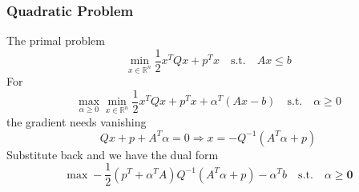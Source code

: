 \documentclass[../main.tex]{subfiles}
\begin{document}
            \subsubsection{Quadratic Problem}
                The primal problem
                \[
                    \min_{x\in\mathbb{R}^n} \frac{1}{2} x^T Q x + p^T x \mathrm{\quad s.t. \quad} Ax\leq b
                \]
                For
                \[
                    \max_{\alpha\geq 0}\min_{x\in\mathbb{R}^n} \frac{1}{2} x^T Q x + p^T x + \alpha^T (Ax - b) \mathrm{\quad s.t. \quad} \alpha \geq 0
                \]
                the gradient needs vanishing
                \[
                    Qx + p + A^T \alpha = 0 \Rightarrow x = -Q^{-1}(A^T \alpha + p)
                \]
                Substitute back and we have the dual form
                \[
                    \max -\frac{1}{2}(p^T + \alpha^T A) Q^{-1} (A^T\alpha + p) - \alpha^T b \mathrm{\quad s.t. \quad} \alpha \geq \mathbf{0} 
                \]
\end{document}
